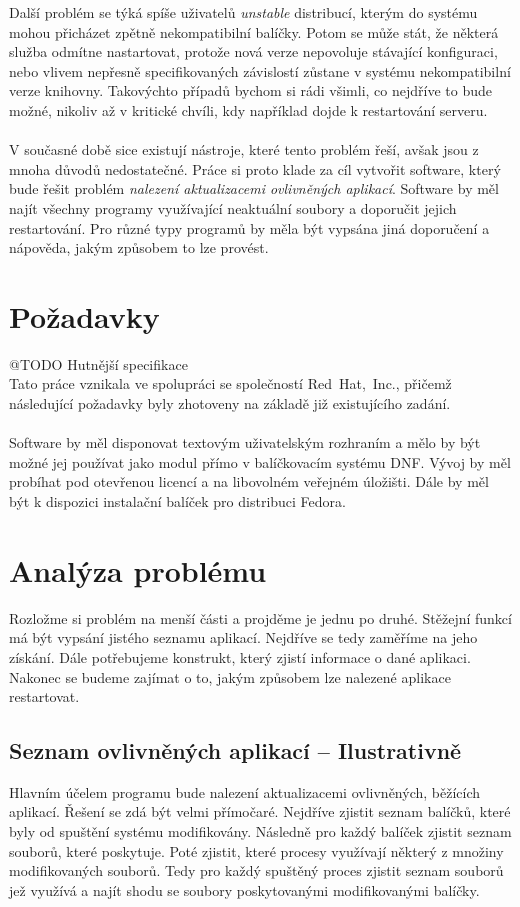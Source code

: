 \documentclass[10pt,a4paper]{article}
\begin{document}
		Další problém se týká spíše uživatelů \textit{unstable} distribucí, kterým do systému mohou přicházet zpětně nekompatibilní balíčky. Potom se může stát, že některá služba odmítne nastartovat, protože nová verze nepovoluje stávající konfiguraci, nebo vlivem nepřesně specifikovaných závislostí zůstane v systému nekompatibilní verze knihovny. Takovýchto případů bychom si rádi všimli, co nejdříve to bude možné, nikoliv až v kritické chvíli, kdy například dojde k restartování serveru.
		\\
		\\
		V současné době sice existují nástroje, které tento problém řeší, avšak jsou z mnoha důvodů nedostatečné. Práce si proto klade za cíl vytvořit software, který bude řešit problém \textit{nalezení aktualizacemi ovlivněných aplikací}. Software by měl najít všechny programy využívající neaktuální soubory a doporučit jejich restartování. Pro různé typy programů by měla být vypsána jiná doporučení a nápověda, jakým způsobem to lze provést.

		\section{Požadavky}
		@TODO Hutnější specifikace\\

		Tato práce vznikala ve spolupráci se společností Red~Hat,~Inc., přičemž následující požadavky byly zhotoveny na základě již existujícího zadání.
		\\
		\\
		Software by měl disponovat textovým uživatelským rozhraním a mělo by být možné jej používat jako modul přímo v balíčkovacím systému DNF\@. Vývoj by měl probíhat pod otevřenou licencí a na libovolném veřejném úložišti. Dále by měl být k dispozici instalační balíček pro distribuci Fedora.

	\section{Analýza problému}
	Rozložme si problém na menší části a projděme je jednu po druhé. Stěžejní funkcí má být vypsání jistého seznamu aplikací. Nejdříve se tedy zaměříme na jeho získání. Dále potřebujeme konstrukt, který zjistí informace o  dané aplikaci. Nakonec se budeme zajímat o to, jakým způsobem lze nalezené aplikace restartovat.

		\subsection{Seznam ovlivněných aplikací -- Ilustrativně}
		Hlavním účelem programu bude nalezení aktualizacemi ovlivněných, běžících aplikací. Řešení se zdá být velmi přímočaré. Nejdříve zjistit seznam balíčků, které byly od spuštění systému modifikovány. Následně pro každý balíček zjistit seznam souborů, které poskytuje. Poté zjistit, které procesy využívají některý z množiny modifikovaných souborů. Tedy pro každý spuštěný proces zjistit seznam souborů jež využívá a najít shodu se soubory poskytovanými modifikovanými balíčky.
\end{document}
